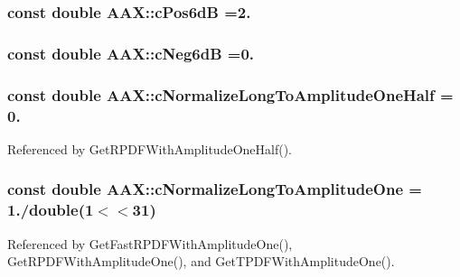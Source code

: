 \subsubsection[{c\+Pos6d\+B}]{\setlength{\rightskip}{0pt plus 5cm}const double A\+A\+X\+::c\+Pos6d\+B =2.}\label{a00288_aade00875e4e88b00d991197f574c42ed}
\hypertarget{a00288_aca5925abc898233b406504d92ee9ef4c}{}
\subsubsection[{c\+Neg6d\+B}]{\setlength{\rightskip}{0pt plus 5cm}const double A\+A\+X\+::c\+Neg6d\+B =0.}\label{a00288_aca5925abc898233b406504d92ee9ef4c}
\hypertarget{a00288_a93ce2d3935dc06b1c4c887568df84788}{}
\subsubsection[{c\+Normalize\+Long\+To\+Amplitude\+One\+Half}]{\setlength{\rightskip}{0pt plus 5cm}const double A\+A\+X\+::c\+Normalize\+Long\+To\+Amplitude\+One\+Half = 0.}\label{a00288_a93ce2d3935dc06b1c4c887568df84788}


Referenced by Get\+R\+P\+D\+F\+With\+Amplitude\+One\+Half().

\hypertarget{a00288_ad30333177ff94148492a02325045a827}{}
\subsubsection[{c\+Normalize\+Long\+To\+Amplitude\+One}]{\setlength{\rightskip}{0pt plus 5cm}const double A\+A\+X\+::c\+Normalize\+Long\+To\+Amplitude\+One = 1./double(1$<$$<$31)}\label{a00288_ad30333177ff94148492a02325045a827}


Referenced by Get\+Fast\+R\+P\+D\+F\+With\+Amplitude\+One(), Get\+R\+P\+D\+F\+With\+Amplitude\+One(), and Get\+T\+P\+D\+F\+With\+Amplitude\+One().

\hypertarget{a00288_a1b66f305f76b3f27b75c275c805c3d9b}{}
